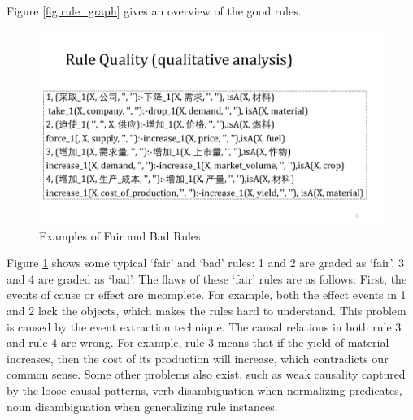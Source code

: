
Figure \ref{fig:rule_graph} gives an overview of the good rules.
\begin{figure}[htbp]
	\centering
	\includegraphics[width=0.95\columnwidth]{figures/rule_cases}
	\caption{Examples of Fair and Bad Rules}
	\label{fig:rule_cases}
\end{figure}
Figure \ref{fig:rule_cases} shows some typical `fair' and `bad' rules: 1 and 2 are graded as `fair'. 3 and 4 are graded as `bad'.
The flaws of these `fair' rules are as follows:
First, the events of cause or effect are incomplete. For example, both the effect events in 1 and 2 lack the objects, which makes the rules hard to understand. This problem is caused by the event extraction technique. The causal relations in both rule 3 and rule 4 are wrong.
For example, rule 3 means that if the yield of material increases, then the cost of its production will increase, which contradicts our common sense.
Some other problems also exist, such as weak causality captured by the loose causal patterns, verb disambiguation when normalizing predicates, noun disambiguation when generalizing rule instances.


